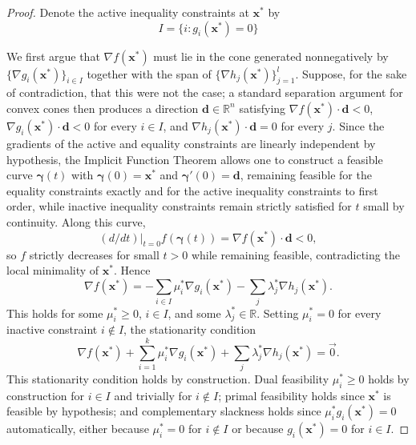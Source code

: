 \begin{proof}
Denote the active inequality constraints at $\mathbf{x}^*$ by
\[
I = \{i : g_i(\mathbf{x}^*) = 0\}
\]

We first argue that $\nabla f(\mathbf{x}^*)$ must lie in the cone generated nonnegatively by $\{\nabla g_i(\mathbf{x}^*)\}_{i \in I}$ together with the span of $\{\nabla h_j(\mathbf{x}^*)\}_{j=1}^l$. Suppose, for the sake of contradiction, that this were not the case; a standard separation argument for convex cones then produces a direction $\mathbf{d} \in \mathbb{R}^n$ satisfying $\nabla f(\mathbf{x}^*) \cdot \mathbf{d} < 0$, $\nabla g_i(\mathbf{x}^*) \cdot \mathbf{d} < 0$ for every $i \in I$, and $\nabla h_j(\mathbf{x}^*) \cdot \mathbf{d} = 0$ for every $j$. Since the gradients of the active and equality constraints are linearly independent by hypothesis, the Implicit Function Theorem allows one to construct a feasible curve $\boldsymbol{\gamma}(t)$ with $\boldsymbol{\gamma}(0) = \mathbf{x}^*$ and $\boldsymbol{\gamma}'(0) = \mathbf{d}$, remaining feasible for the equality constraints exactly and for the active inequality constraints to first order, while inactive inequality constraints remain strictly satisfied for $t$ small by continuity. Along this curve,
\[
(d/dt)|_{t=0} f(\boldsymbol{\gamma}(t)) = \nabla f(\mathbf{x}^*) \cdot \mathbf{d} < 0,
\] so $f$ strictly decreases for small $t>0$ while remaining feasible, contradicting the local minimality of $\mathbf{x}^*$. Hence
\[
\nabla f(\mathbf{x}^*) = -\sum_{i \in I} \mu_i^* \nabla g_i(\mathbf{x}^*) - \sum_j \lambda_j^* \nabla h_j(\mathbf{x}^*).
\]
This holds for some $\mu_i^* \geq 0$, $i \in I$, and some $\lambda_j^* \in \mathbb{R}$. Setting $\mu_i^* = 0$ for every inactive constraint $i \notin I$, the stationarity condition
\[
\nabla f(\mathbf{x}^*) + \sum_{i=1}^k \mu_i^* \nabla g_i(\mathbf{x}^*) + \sum_j \lambda_j^*\nabla h_j(\mathbf{x}^*) = \vec{0}.
\]
This stationarity condition holds by construction. Dual feasibility $\mu_i^* \geq 0$ holds by construction for $i \in I$ and trivially for $i \notin I$; primal feasibility holds since $\mathbf{x}^*$ is feasible by hypothesis; and complementary slackness holds since $\mu_i^* g_i(\mathbf{x}^*) = 0$ automatically, either because $\mu_i^*=0$ for $i \notin I$ or because $g_i(\mathbf{x}^*)=0$ for $i \in I$.
\end{proof}

